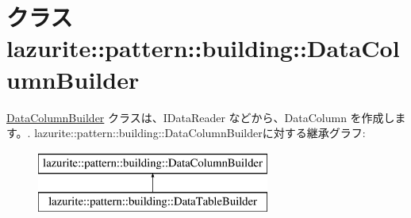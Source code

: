 \hypertarget{classlazurite_1_1pattern_1_1building_1_1_data_column_builder}{
\section{クラス lazurite::pattern::building::DataColumnBuilder}
\label{classlazurite_1_1pattern_1_1building_1_1_data_column_builder}
}


\hyperlink{classlazurite_1_1pattern_1_1building_1_1_data_column_builder}{DataColumnBuilder} クラスは、IDataReader などから、DataColumn を作成します。.  
lazurite::pattern::building::DataColumnBuilderに対する継承グラフ:\begin{figure}[H]
\begin{center}
\leavevmode
\includegraphics[height=2cm]{classlazurite_1_1pattern_1_1building_1_1_data_column_builder}
\end{center}
\end{figure}
